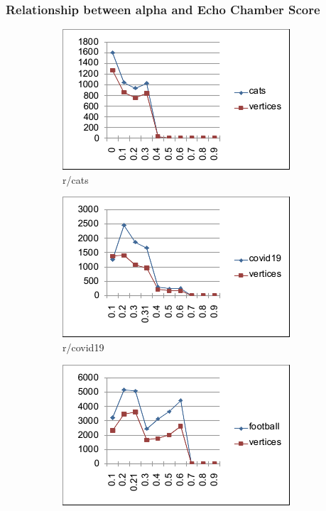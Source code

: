 \documentclass{beamer}
\begin{document}
\begin{frame}[c]
	\frametitle{Relationship between alpha and Echo Chamber Score}
	\begin{figure}
		\begin{center}
			\begin{subfigure}[b]{0.3\textwidth}
				\centering
				\includegraphics[width=\textwidth]{out/alpha/cats_alpha.png}
				\caption{r/cats}
				\label{fig:out/alpha/cats_alpha.png}
			\end{subfigure}
			\begin{subfigure}[b]{0.3\textwidth}
				\centering
				\includegraphics[width=\textwidth]{out/alpha/covid19_alpha.png}
				\caption{r/covid19}
				\label{fig:out/alpha/covid19_alpha.png}
			\end{subfigure}
			\begin{subfigure}[b]{0.3\textwidth}
				\centering
				\includegraphics[width=\textwidth]{out/alpha/football_alpha.png}

\end{subfigure}
\end{center}
\end{figure}
\end{frame}
\end{document}
